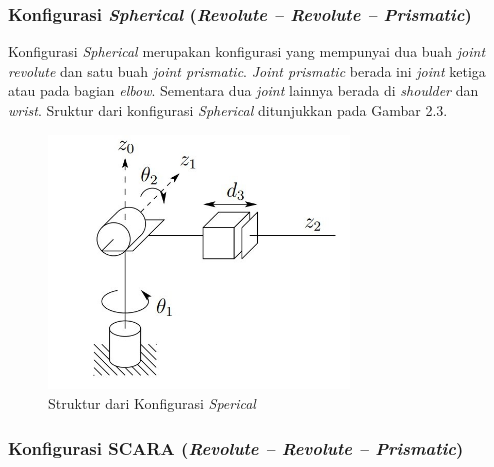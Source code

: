 \subsubsection{Konfigurasi \textit{Spherical} (\textit{Revolute – Revolute – Prismatic})} 

Konfigurasi \textit{Spherical} merupakan konfigurasi yang mempunyai dua buah \textit{joint revolute} dan satu buah \textit{joint prismatic}. \textit{Joint prismatic} berada ini \textit{joint} ketiga atau pada bagian \textit{elbow}. Sementara dua \textit{joint} lainnya berada di \textit{shoulder} dan \textit{wrist}. Sruktur dari konfigurasi \textit{Spherical} ditunjukkan pada Gambar 2.3.
	\begin{figure}[H]
	\centering
	\includegraphics[width=8cm]{gambar/spherical.jpg}
	\caption{Struktur dari Konfigurasi \textit{Sperical}}
\end{figure}


\subsubsection{Konfigurasi SCARA (\textit{Revolute – Revolute – Prismatic}) } 

